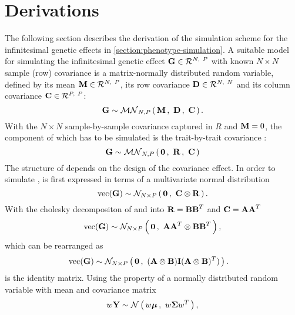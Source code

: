 \chapter{Derivations}
\label{section:simulating-G}
The following section describes the derivation of the simulation scheme for the infinitesimal genetic effects in \cref{section:phenotype-simulation}.
A suitable model for simulating the infinitesimal genetic effect \(\boldsymbol{\mathbf{G}} \in \mathcal{R}^{N,~P}\) with known \(N \times N\) sample (row) covariance is a matrix-normally distributed random variable, defined by its mean \(\boldsymbol{\mathbf{M}} \in \mathcal{R}^{N,~P}\), its row covariance \(\boldsymbol{\mathbf{D}} \in \mathcal{R}^{N,~N}\) and its column covariance \(\boldsymbol{\mathbf{C}} \in \mathcal{R}^{P,~P}\): 
%
\begin{equation}
\boldsymbol{\mathbf{G}} \sim \mathcal{MN}_{N,P}\left(\, \boldsymbol{\mathbf{{M}}} \,,~\boldsymbol{\mathbf{{D}}}\,,~\boldsymbol{\mathbf{{C}}} \,\right).
\label{eq:mvn}
\end{equation}
%
With the \(N \times N\) sample-by-sample covariance captured in \(R\) and  \(\boldsymbol{\mathbf{M}}=0\), the component of  which has to be simulated is the trait-by-trait covariance :
%
\begin{equation}
\boldsymbol{\mathbf{G}} \sim  \mathcal{MN}_{N,P}\left(\, \boldsymbol{\mathbf{{0}}} \,,~\boldsymbol{\mathbf{{R}}}\,,~\boldsymbol{\mathbf{{C}}} \,\right)
\label{eq:G-mvn}
\end{equation}
%
The structure of  depends on the design of the covariance effect. In order to simulate ,  is first expressed in terms of a multivariate normal distribution 
%
\begin{equation}
\text{vec}(\boldsymbol{\mathbf{G}}) \sim \mathcal{N}_{N\times P}\left(\, {\boldsymbol{\mathbf{0}}} \,,~{\boldsymbol{\mathbf{C}} \otimes \boldsymbol{\mathbf{R}}} \,\right).
\end{equation}
%
With the cholesky decompositon of  and  into  \(\boldsymbol{\mathbf{R}}=\boldsymbol{\mathbf{BB}}^T\) and \(\boldsymbol{\mathbf{C}}=\boldsymbol{\mathbf{AA}}^T\) 
%
\begin{equation}
\text{vec}(\boldsymbol{\mathbf{G}}) \sim \mathcal{N}_{N\times P}\left(\, {\boldsymbol{\mathbf{0}}} \,,~{\boldsymbol{\mathbf{AA}}^T  \otimes \boldsymbol{\mathbf{BB}}^T} \,\right),  
\end{equation}
%
which can be rearranged as 
%
\begin{equation}
\begin{aligned}
\text{vec}(\boldsymbol{\mathbf{G}}) & \sim \mathcal{N}_{N\times P}\left(\, {\boldsymbol{\mathbf{0}}} \,,~{(\boldsymbol{\mathbf{A }}\otimes \boldsymbol{\mathbf{B}}) \boldsymbol{\mathbf{I}} (\boldsymbol{\mathbf{A}} \otimes\boldsymbol{\mathbf{B}})^T)} \,\right). 
\end{aligned}
\end{equation}
 is the identity matrix.
Using the property of a normally distributed random variable  with mean \tmat{\mu} and covariance matrix \tmat{\Sigma}
%
\begin{equation}
\begin{aligned} 
w \boldsymbol{\mathbf{Y}} \sim \mathcal{N}\left(\,{w\boldsymbol{\mathbf{\mu}}}\,,~{w\boldsymbol{\mathbf{\Sigma}} w^T}\,\right),
\end{aligned}
\end{equation}
